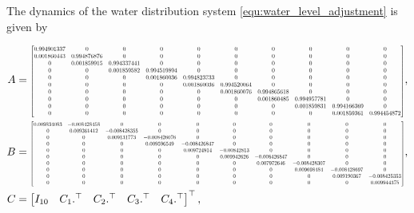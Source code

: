 The dynamics of the water distribution system \eqref{equ:water_level_adjustment} is given by


\begin{strip}
\begin{align*}
    A &=\resizebox{1\hsize}{!}{$\begin{bmatrix}
    0.994901337 & 0 & 0 & 0 & 0 & 0& 0 & 0& 0 &0\\
    0.001860443	& 0.994876876 & 0 & 0 & 0 & 0& 0 & 0& 0 &0 \\
    0 & 0.001859915& 0.994337441 & 0 & 0 & 0& 0 & 0& 0 &0 \\
    0 & 0 & 0.001859582 & 0.994519894 & 0 & 0 & 0& 0 & 0& 0 \\
    0 & 0 & 0& 0.001860036	& 0.994823733 & 0 & 0 & 0& 0 & 0 \\
    0 & 0 & 0 & 0 &	0.001860036	& 0.994520064 & 0 & 0 & 0& 0 \\
    0 & 0 & 0 & 0 & 0&  0.001860076 & 0.994865618 & 0 & 0 & 0\\
    0 & 0 & 0 & 0 & 0 &0 & 0.001860485 & 0.994957781 & 0 & 0 \\
    0 & 0 & 0 & 0 & 0 &0 &0 & 0.001859831 & 0.994166369 & 0 \\
    0 & 0 & 0 & 0 & 0 &0 & 0 &0 & 0.001859361 & 0.994454872
\end{bmatrix}$}, \\
B &= \resizebox{1\hsize}{!}{$\begin{bmatrix}
    0.009834083 & -0.008428458 & 0 & 0 & 0 & 0& 0 & 0& 0 &0\\
    0 & 0.009361412 & -0.008428355 & 0 & 0 & 0 & 0& 0 & 0& 0 \\
    0& 0 & 0.009131773 & -0.008426076 & 0 & 0 & 0& 0 & 0& 0 \\
    0 &0 & 0 & 0.009596549 & -0.008426847 & 0 & 0 & 0& 0 & 0\\
    0 & 0 & 0& 0& 0.009724914 & -0.00842813 & 0 & 0 & 0& 0 \\
    0 & 0 & 0 & 0 & 0 & 0.009942626 & -0.008426847 & 0 & 0 & 0 \\
    0 & 0 & 0 & 0 & 0& 0& 0.007972646 & -0.008428307 & 0 & 0\\
    0 & 0 & 0 & 0 & 0 &0 &0 & 0.009698484 & -0.008428697 & 0  \\
    0 & 0 & 0 & 0 & 0 &0 &0 & 0 & 0.009190367 & -0.008425353  \\
    0 & 0 & 0 & 0 & 0 &0 & 0 &0 & 0 & 0.009944375
\end{bmatrix}$},\\
C &= \begin{bmatrix}
   I_{10} &
C_1.^{\top}& C_2.^{\top}&C_3.^{\top}&C_4.^{\top}
\end{bmatrix}^{\top},
\end{align*}


\end{strip}
